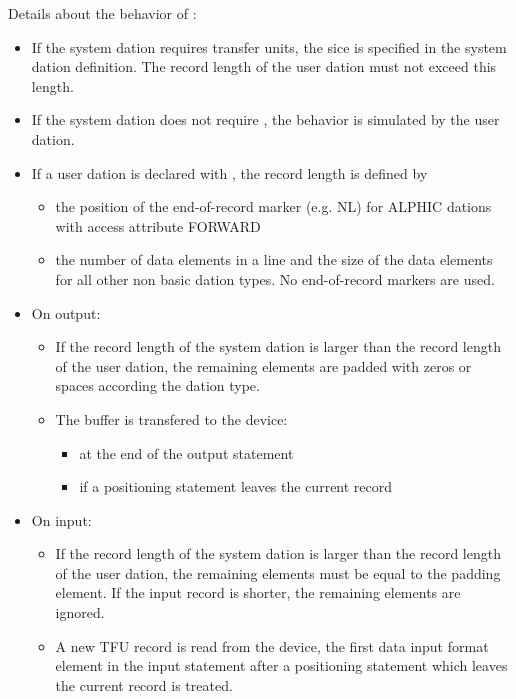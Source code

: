 \begin{added}
Details about the behavior of :
\begin{itemize}
\item If the system dation requires transfer units, the sice is specified
   in the system dation definition. The record length of the user dation must not
   exceed this length. 
\item If the system dation does not require , the behavior is simulated
  by the user dation.
\item If a user dation is declared with , the record length is defined by
  \begin{itemize}
   \item the position of the end-of-record marker (e.g. NL) for ALPHIC dations
      with access attribute FORWARD
   \item the number of data elements in a line and the size of the data elements for
      all other non basic  dation types. No end-of-record markers are used.
  \end{itemize}
\item On output:
  \begin{itemize}
  \item  If the record length of the system dation is larger than
   the record length of the user dation, the remaining elements
    are padded with zeros or spaces according the dation type.
  \item The  buffer is transfered to the device:
  \begin{itemize}
   \item at the end of the output statement
   \item if a positioning statement leaves the current record
  \end{itemize}
  \end{itemize}
\item On input:
  \begin{itemize}
  \item If the record length of the system dation is larger than
   the record length of the user dation, the remaining elements must be equal
   to the padding element.
   If the input record is shorter, the remaining elements are ignored.
\item A new TFU record is read from the device,
   the first data input format element in the input statement
   after a positioning statement which leaves the current record is treated.
\end{itemize}
\end{itemize}
\end{added}

